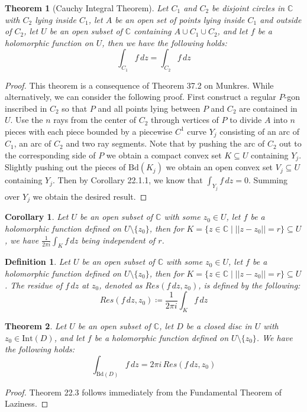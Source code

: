 \documentclass[11pt,oneside]{book}
\theoremstyle{break}
\theoremstyle{break}
\newtheorem{thm}{Theorem}[section]
\newtheorem{corT}[lem]{Corollary}
\newtheorem{defn}{Definition}[corL]
\newcommand{\Complex}{\mathbb{C}}
\newcommand{\Int}{\text{Int}}
\newcommand{\Bd}{\text{Bd}}
\begin{document}
\begin{thm}[Cauchy Integral Theorem]
Let $C_1$ and $C_2$ be disjoint circles in $\Complex$ with $C_2$ lying inside $C_1$, let $A$ be an open set of points lying inside $C_1$ and outside of $C_2$, let $U$ be an open subset of $\Complex$ containing $A\cup C_1 \cup C_2$, and let $f$ be a holomorphic function on $U$, then we have the following holds: $$\int_{C_1} f \, dz = \int_{C_2} f\, dz$$ 
\end{thm}
\begin{proof}
This theorem is a consequence of Theorem 37.2 on Munkres. While alternatively, we can consider the following proof. First construct a regular $P$-gon inscribed in $C_2$ so that $P$ and all points lying between $P$ and $C_2$ are contained in $U$. Use the $n$ rays from the center of $C_2$ through vertices of $P$ to divide $A$ into $n$ pieces with each piece bounded by a piecewise $C^1$ curve $Y_j$ consisting of an arc of $C_1$, an arc of $C_2$ and two ray segments. Note that by
pushing the arc of $C_2$ out to the corresponding side of $P$ we obtain a compact convex set $K\subseteq U$ containing $Y_j$. Slightly pushing out the pieces of $\Bd(K_j)$ we obtain an open convex set $V_j \subseteq U$ containing $Y_j$. Then by Corollary 22.1.1, we know that $\int_{Y_j} f\, dz = 0$. Summing over $Y_j$ we obtain the desired result. 
\end{proof}

\begin{corT}
Let $U$ be an open subset of $\Complex$ with some $z_0 \in U$, let $f$ be a holomorphic function defined on $U\setminus \{z_0\}$, then for $K = \{z \in \Complex \mid ||z - z_0|| = r\} \subseteq U$, we have $\frac{1}{2\pi i}\int_K f\, dz$ being independent of $r$. 
\end{corT}

\begin{defn}
Let $U$ be an open subset of $\Complex$ with some $z_0 \in U$, let $f$ be a holomorphic function defined on $U\setminus \{z_0\}$, then for $K = \{z \in \Complex \mid ||z - z_0|| = r\} \subseteq U$. The residue of $f\, dz$ at $z_0$, denoted as $Res(f\,dz, z_0)$, is defined by the following: $$Res(f\,dz, z_0)\coloneqq \frac{1}{2\pi i}\int_K f\, dz$$
\end{defn}


\begin{thm}
Let $U$ be an open subset of $\Complex$, let $D$ be a closed disc in $U$ with $z_0 \in \Int(D)$, and let $f$ be a holomorphic function defined on $U \setminus \{ z_0\}$. We have the following holds:
$$\int_{\Bd(D)} f\, dz = 2\pi i \, Res(f\, dz, z_0)$$
\end{thm}
\begin{proof}
Theorem 22.3 follows immediately from the Fundamental Theorem of Laziness.
\end{proof}
\end{document}
